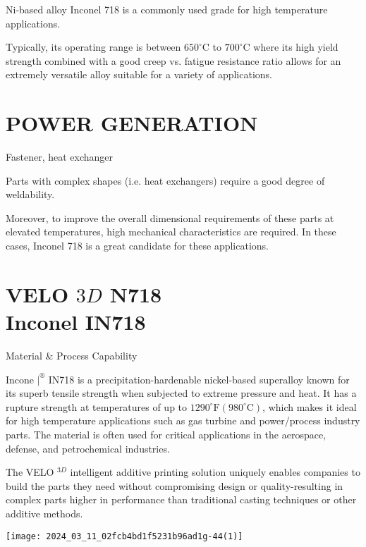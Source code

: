 \documentclass[10pt]{article}
\begin{document}
Ni-based alloy Inconel 718 is a commonly used grade for high temperature applications.

Typically, its operating range is between $650^{\circ} \mathrm{C}$ to $700^{\circ} \mathrm{C}$ where its high yield strength combined with a good creep vs. fatigue resistance ratio allows for an extremely versatile alloy suitable for a variety of applications.

\section*{POWER GENERATION}
Fastener, heat exchanger

Parts with complex shapes (i.e. heat exchangers) require a good degree of weldability.

Moreover, to improve the overall dimensional requirements of these parts at elevated temperatures, high mechanical characteristics are required. In these cases, Inconel 718 is a great candidate for these applications.

\section*{VELO $3 D$ N718 \\
 Inconel IN718}
Material \& Process Capability

Incone $\left.\right|^{\circledR}$ IN718 is a precipitation-hardenable nickel-based superalloy known for its superb tensile strength when subjected to extreme pressure and heat. It has a rupture strength at temperatures of up to $1290^{\circ} \mathrm{F}\left(980^{\circ} \mathrm{C}\right)$, which makes it ideal for high temperature applications such as gas turbine and power/process industry parts. The material is often used for critical applications in the aerospace, defense, and petrochemical industries.

The VELO ${ }^{3 D}$ intelligent additive printing solution uniquely enables companies to build the parts they need without compromising design or quality-resulting in complex parts higher in performance than traditional casting techniques or other additive methods.

\begin{center}
\texttt{[image: 2024\_03\_11\_02fcb4bd1f5231b96ad1g-44(1)]}
\end{center}
\end{document}

